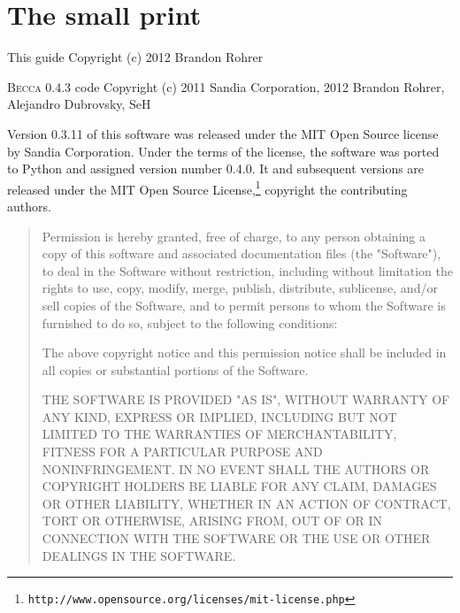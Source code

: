 \chapter{The small print}

This guide
Copyright (c) 2012 Brandon Rohrer

\textsc{Becca} 0.4.3 code
Copyright (c) 2011 Sandia Corporation,
2012 Brandon Rohrer, Alejandro Dubrovsky, SeH

Version 0.3.11 of this software was released under the MIT Open Source 
license by Sandia Corporation. Under the terms of the license, the 
software was ported to Python and assigned version number 0.4.0. It and
subsequent versions are released under the MIT Open Source License,\footnote{\texttt{http://www.opensource.org/licenses/mit-license.php}} copyright the contributing authors.

\begin{quote}
Permission is hereby granted, free of charge, to any person obtaining a copy
of this software and associated documentation files (the "Software"), to deal
in the Software without restriction, including without limitation the rights
to use, copy, modify, merge, publish, distribute, sublicense, and/or sell
copies of the Software, and to permit persons to whom the Software is
furnished to do so, subject to the following conditions:

The above copyright notice and this permission notice shall be included in
all copies or substantial portions of the Software.

THE SOFTWARE IS PROVIDED "AS IS", WITHOUT WARRANTY OF ANY KIND, EXPRESS OR
IMPLIED, INCLUDING BUT NOT LIMITED TO THE WARRANTIES OF MERCHANTABILITY,
FITNESS FOR A PARTICULAR PURPOSE AND NONINFRINGEMENT. IN NO EVENT SHALL THE
AUTHORS OR COPYRIGHT HOLDERS BE LIABLE FOR ANY CLAIM, DAMAGES OR OTHER
LIABILITY, WHETHER IN AN ACTION OF CONTRACT, TORT OR OTHERWISE, ARISING FROM,
OUT OF OR IN CONNECTION WITH THE SOFTWARE OR THE USE OR OTHER DEALINGS IN
THE SOFTWARE.

\end{quote}